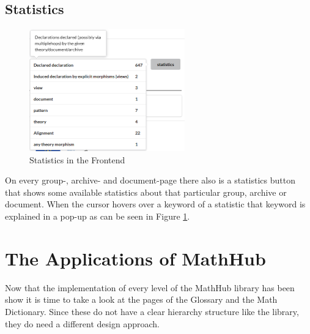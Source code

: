\documentclass[11pt,a4paper]{article}
\begin{document}
\subsection{Statistics}
\begin{figure}[H]
\centerline{\includegraphics[width=0.6\textwidth]{statistics.png}}
\caption{Statistics in the Frontend}
\label{fig:stats}
\end{figure}
On every group-, archive- and document-page there also is a statistics button that shows some available statistics about that particular group, archive or document.
When the cursor hovers over a keyword of a statistic that keyword is explained in a pop-up as can be seen in Figure \ref{fig:stats}.
\newpage
\section{The Applications of MathHub} \label{apps}
Now that the implementation of every level of the MathHub library has been show it is time to take a look at the pages of the Glossary and the Math Dictionary. 
Since these do not have a clear hierarchy structure like the library, they do need a different design approach.
\end{document}
